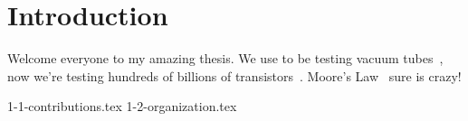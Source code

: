 \chapter{Introduction}

Welcome everyone to my amazing thesis. We use to be testing vacuum tubes~\cite{jacm59_test}, now we're testing hundreds of billions of transistors~\cite{hotchips24_blackwell}. Moore's Law~\cite{moore65,moore75} sure is crazy!

{1-1-contributions.tex}
{1-2-organization.tex}
